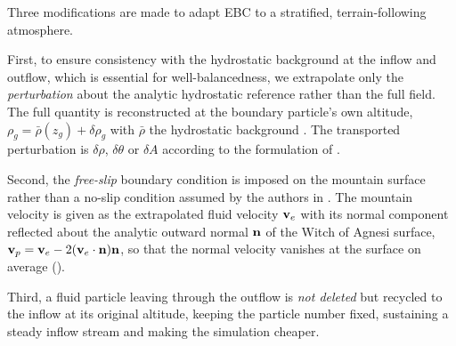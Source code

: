 \documentclass[../main.tex]{subfiles}
\begin{document}
Three modifications are made to adapt EBC to a stratified, terrain-following atmosphere.

First, to ensure consistency with the hydrostatic background at the inflow and outflow, which is essential for well-balancedness, we extrapolate only the \emph{perturbation} about the analytic hydrostatic reference rather than the full field. The full quantity is reconstructed at the boundary particle's own altitude, \eg $\rho_g = \bar{\rho}(z_g) + \delta\rho_g$ with $\bar{\rho}$ the hydrostatic background . The transported perturbation is $\delta\rho$, $\delta\theta$ or $\delta A$ according to the formulation of .

Second, the \emph{free-slip} boundary condition is imposed on the mountain surface rather than a no-slip condition assumed by the authors in \autocite{mahdizadehExtrapolationBoundaryConditions2025}. The mountain velocity is given as the extrapolated fluid velocity $\mathbf{v}_e$ with its normal component reflected about the analytic outward normal $\mathbf{n}$ of the Witch of Agnesi surface, $\mathbf{v}_p = \mathbf{v}_e - 2(\mathbf{v}_e\cdot\mathbf{n})\mathbf{n}$, so that the normal velocity vanishes at the surface on average ().

Third, a fluid particle leaving through the outflow is \emph{not deleted} but recycled to the inflow at its original altitude, keeping the particle number fixed, sustaining a steady inflow stream and making the simulation cheaper.
\end{document}

